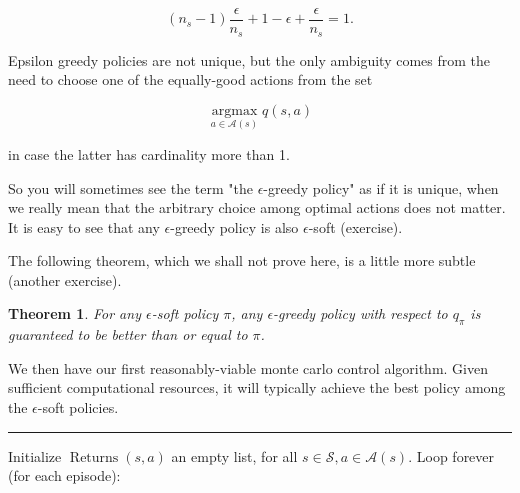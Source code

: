\documentclass[11pt]{article}
\theoremstyle{plain} %
\newtheorem{theorem}{Theorem}[section]
\theoremstyle{remark}
\begin{document}
$$
  \left(n_{s}-1\right) \frac{\epsilon}{n_{s}}+1-\epsilon+\frac{\epsilon}{n_{s}}=1 .
$$

 Epsilon greedy policies are not unique, but the only ambiguity comes
        from the need to choose one of the equally-good actions from the set 

$$
  \underset{a \in \mathcal{A}(s)}{\operatorname{argmax}} q(s, a)
$$

in case the latter has cardinality more than 1.

 So you will sometimes see the term "the $\epsilon$-greedy policy" as
        if it is unique, when we really mean that the arbitrary choice among optimal
        actions does not matter. It is easy to see that any $\epsilon$-greedy policy is also
        $\epsilon$-soft (exercise).

The following theorem, which we shall not prove here, is a little more subtle
(another exercise).

\begin{theorem}
  For any $\epsilon$-soft policy $\pi$, any $\epsilon$-greedy policy with
respect to $q_{\pi}$ is guaranteed to be better than or equal to $\pi$.
\end{theorem}


 We then have our first reasonably-viable monte carlo control
        algorithm. Given sufficient computational resources, it will typically achieve
        the best policy among the $\epsilon$-soft policies.

\vspace*{0.65em}
\hrule

Initialize $\operatorname{Returns}(s, a)$ an empty list, for all $s
          \in \mathcal{S}, a \in \mathcal{A}(s)$. Loop forever (for each episode):
\end{document}
